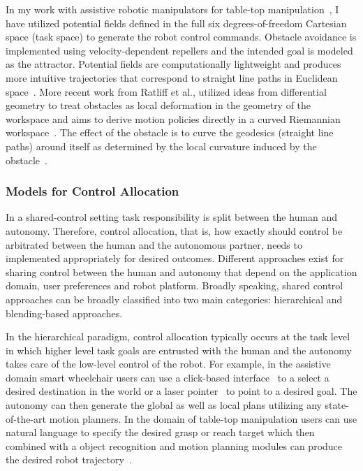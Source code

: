 \documentclass[12pt]{article}
\begin{document}
 In my work with assistive robotic manipulators for table-top manipulation~\cite{gopinath2017human}, I have utilized potential fields defined in the full six degrees-of-freedom Cartesian space (task space) to generate the robot control commands. Obstacle avoidance is implemented using velocity-dependent repellers and the intended goal is modeled as the attractor. Potential fields are computationally lightweight and produces more intuitive trajectories that correspond to straight line paths in Euclidean space~\cite{khatib1986real}. More recent work from Ratliff et al., utilized ideas from differential geometry to treat obstacles as local deformation in the geometry of the workspace and aims to derive motion policies directly in a curved Riemannian workspace~\cite{ratliff2018riemannian}. The effect of the obstacle is to curve the geodesics (straight line paths) around itself as determined by the local curvature induced by the obstacle~\cite{mainprice2016warping}. 
\subsubsection{Models for Control Allocation}

In a shared-control setting task responsibility is split between the human and autonomy. Therefore, control allocation, that is, how exactly should control be arbitrated between the human and the autonomous partner, needs to implemented appropriately for desired outcomes. Different approaches exist for sharing control between the human and autonomy that depend on the application domain, user preferences and robot platform. 
Broadly speaking, shared control approaches can be broadly classified into two main categories: hierarchical and blending-based approaches.

In the hierarchical paradigm, control allocation typically occurs at the task level in which higher level task goals are entrusted with the human and the autonomy takes care of the low-level control of the robot. For example, in the assistive domain smart wheelchair users can use a click-based interface~\cite{simpson2008tooth} to a select a desired destination in the world or a laser pointer~\cite{choi2008laser} to point to a desired goal. The autonomy can then generate the global as well as local plans utilizing any state-of-the-art motion planners. In the domain of table-top manipulation users can use natural language to specify the desired grasp or reach target which then combined with a object recognition and motion planning modules can produce the desired robot trajectory~\cite{broad2016towards}. 
\end{document}
